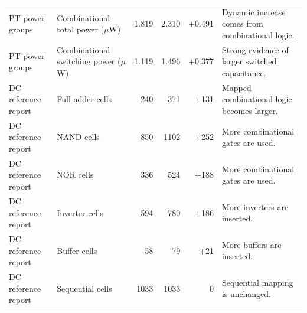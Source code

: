\documentclass[11pt,a4paper]{article}
\begin{document}
\begin{table}[h]
\begin{tabularx}{\textwidth}{llrrrX}
PT power groups & Combinational total power ($\mu$W) & 1.819 & 2.310 & +0.491 & Dynamic increase comes from combinational logic. \\
PT power groups & Combinational switching power ($\mu$W) & 1.119 & 1.496 & +0.377 & Strong evidence of larger switched capacitance. \\
\midrule
DC reference report & Full-adder cells & 240 & 371 & +131 & Mapped combinational logic becomes larger. \\
DC reference report & NAND cells & 850 & 1102 & +252 & More combinational gates are used. \\
DC reference report & NOR cells & 336 & 524 & +188 & More combinational gates are used. \\
DC reference report & Inverter cells & 594 & 780 & +186 & More inverters are inserted. \\
DC reference report & Buffer cells & 58 & 79 & +21 & More buffers are inserted. \\
DC reference report & Sequential cells & 1033 & 1033 & 0 & Sequential mapping is unchanged. \\
\bottomrule
\end{tabularx}
\end{table}
\end{document}
